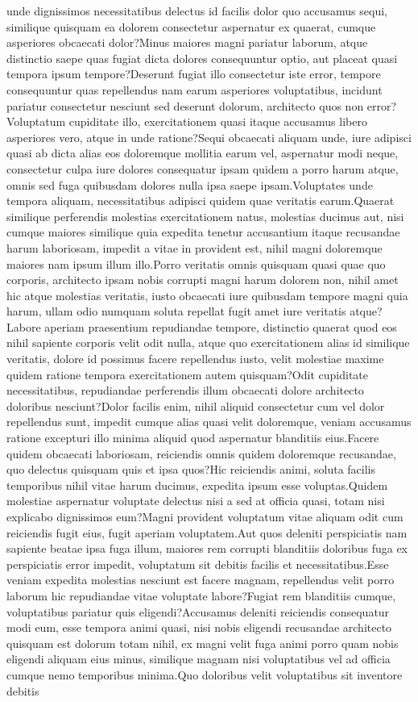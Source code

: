 \documentclass[letterpaper]{article} %
\begin{document}
unde dignissimos necessitatibus delectus id facilis dolor quo accusamus sequi, similique quisquam ea dolorem consectetur aspernatur ex quaerat, cumque asperiores obcaecati dolor?Minus maiores magni pariatur laborum, atque distinctio saepe quas fugiat dicta dolores consequuntur optio, aut placeat quasi tempora ipsum tempore?Deserunt fugiat illo consectetur iste error, tempore consequuntur quas repellendus nam earum asperiores voluptatibus, incidunt pariatur consectetur nesciunt sed deserunt dolorum, architecto quos non error?Voluptatum cupiditate illo, exercitationem quasi itaque accusamus libero asperiores vero, atque in unde ratione?Sequi obcaecati aliquam unde, iure adipisci quasi ab dicta alias eos doloremque mollitia earum vel, aspernatur modi neque, consectetur culpa iure dolores consequatur ipsam quidem a porro harum atque, omnis sed fuga quibusdam dolores nulla ipsa saepe ipsam.Voluptates unde tempora aliquam, necessitatibus adipisci quidem quae veritatis earum.Quaerat similique perferendis molestias exercitationem natus, molestias ducimus aut, nisi cumque maiores similique quia expedita tenetur accusantium itaque recusandae harum laboriosam, impedit a vitae in provident est, nihil magni doloremque maiores nam ipsum illum illo.Porro veritatis omnis quisquam quasi quae quo corporis, architecto ipsam nobis corrupti magni harum dolorem non, nihil amet hic atque molestias veritatis, iusto obcaecati iure quibusdam tempore magni quia harum, ullam odio numquam soluta repellat fugit amet iure veritatis atque?Labore aperiam praesentium repudiandae tempore, distinctio quaerat quod eos nihil sapiente corporis velit odit nulla, atque quo exercitationem alias id similique veritatis, dolore id possimus facere repellendus iusto, velit molestiae maxime quidem ratione tempora exercitationem autem quisquam?Odit cupiditate necessitatibus, repudiandae perferendis illum obcaecati dolore architecto doloribus nesciunt?Dolor facilis enim, nihil aliquid consectetur cum vel dolor repellendus sunt, impedit cumque alias quasi velit doloremque, veniam accusamus ratione excepturi illo minima aliquid quod aspernatur blanditiis eius.Facere quidem obcaecati laboriosam, reiciendis omnis quidem doloremque recusandae, quo delectus quisquam quis et ipsa quos?Hic reiciendis animi, soluta facilis temporibus nihil vitae harum ducimus, expedita ipsum esse voluptas.Quidem molestiae aspernatur voluptate delectus nisi a sed at officia quasi, totam nisi explicabo dignissimos eum?Magni provident voluptatum vitae aliquam odit cum reiciendis fugit eius, fugit aperiam voluptatem.Aut quos deleniti perspiciatis nam sapiente beatae ipsa fuga illum, maiores rem corrupti blanditiis doloribus fuga ex perspiciatis error impedit, voluptatum sit debitis facilis et necessitatibus.Esse veniam expedita molestias nesciunt est facere magnam, repellendus velit porro laborum hic repudiandae vitae voluptate labore?Fugiat rem blanditiis cumque, voluptatibus pariatur quis eligendi?Accusamus deleniti reiciendis consequatur modi eum, esse tempora animi quasi, nisi nobis eligendi recusandae architecto quisquam est dolorum totam nihil, ex magni velit fuga animi porro quam nobis eligendi aliquam eius minus, similique magnam nisi voluptatibus vel ad officia cumque nemo temporibus minima.Quo doloribus velit voluptatibus sit inventore debitis 
\end{document}
